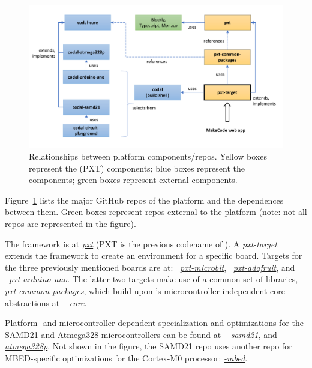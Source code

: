 
\begin{figure}[t]
    \includegraphics[width=5.5in]{reposFig.pdf}
    \caption{\label{fig:repos}Relationships between platform components/repos. Yellow boxes represent the \MC (PXT) components; blue
    boxes represent the \CO components; green boxes represent external components.}
  \end{figure}
  

Figure~\ref{fig:repos} lists the major GitHub repos of the platform
and the dependences between them. Green boxes represent repos external to the platform
(note: not all repos are represented in the figure).

The \MC framework
is at \emph{\href{https://github.com/microsoft/pxt}{pxt}} (PXT is the previous codename of \MCN).
A \emph{pxt-target} extends the framework to create an environment for a specific board. Targets
for the three previously mentioned boards are at:
~\emph{\href{https://github.com/microsoft/pxt-microbit}{pxt-microbit}},
~\emph{\href{https://github.com/microsoft/pxt-adafruit}{pxt-adafruit}}, and
~\emph{\href{https://github.com/microsoft/pxt-arduino-uno}{pxt-arduino-uno}}.
The latter two targets make use of a common set of libraries,
\emph{\href{https://github.com/microsoft/pxt-common-packages}{pxt-common-packages}},
which build upon \CON's microcontroller independent core abstractions at
~\emph{\href{https://github.com/lancaster-university/\CO-core}{\COLN-core}}.

Platform- and microcontroller-dependent specialization and optimizations for
the SAMD21 and Atmega328 microcontrollers can be found at
~\emph{\href{https://github.com/lancaster-university/codal-samd21}{\COLN-samd21}},
and
~\emph{\href{https://github.com/lancaster-university/codal-atmega328p}{\COLN-atmega328p}}.
Not shown in the figure, the SAMD21 repo uses another repo for
MBED-specific optimizations for the Cortex-M0 processor: \emph{\href{https://github.com/lancaster-university/codal-mbed}{\COLN-mbed}}.

